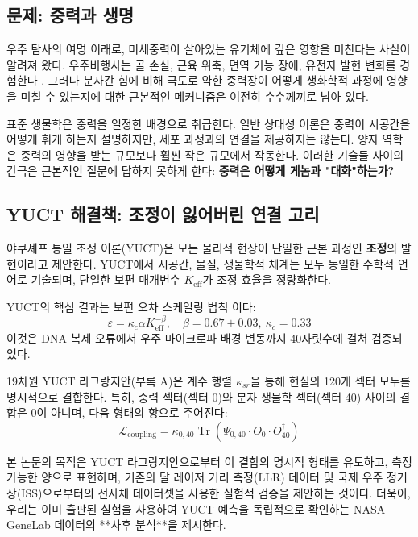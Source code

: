 \documentclass[12pt,a4paper]{article}
\theoremstyle{remark}
\newcommand{\Keff}{K_{\mathrm{eff}}}
\newcommand{\kappac}{\kappa_c}
\newcommand{\eps}{\varepsilon}
\begin{document}
	\subsection{문제: 중력과 생명}
	
	우주 탐사의 여명 이래로, 미세중력이 살아있는 유기체에 깊은 영향을 미친다는 사실이 알려져 왔다. 우주비행사는 골 손실, 근육 위축, 면역 기능 장애, 유전자 발현 변화를 경험한다 \cite{NASA-GeneLab, SpaceX-2023}. 그러나 분자간 힘에 비해 극도로 약한 중력장이 어떻게 생화학적 과정에 영향을 미칠 수 있는지에 대한 근본적인 메커니즘은 여전히 수수께끼로 남아 있다.
	
	표준 생물학은 중력을 일정한 배경으로 취급한다. 일반 상대성 이론은 중력이 시공간을 어떻게 휘게 하는지 설명하지만, 세포 과정과의 연결을 제공하지는 않는다. 양자 역학은 중력의 영향을 받는 규모보다 훨씬 작은 규모에서 작동한다. 이러한 기술들 사이의 간극은 근본적인 질문에 답하지 못하게 한다: \textbf{중력은 어떻게 게놈과 "대화"하는가?}
	
	\subsection{YUCT 해결책: 조정이 잃어버린 연결 고리}
	
	야쿠셰프 통일 조정 이론(YUCT)은 모든 물리적 현상이 단일한 근본 과정인 \textbf{조정}의 발현이라고 제안한다. YUCT에서 시공간, 물질, 생물학적 체계는 모두 동일한 수학적 언어로 기술되며, 단일한 보편 매개변수 \(\Keff\)가 조정 효율을 정량화한다.
	
	YUCT의 핵심 결과는 보편 오차 스케일링 법칙 \cite{AppendixL}이다:
	\begin{equation}
		\eps = \kappac \alpha \Keff^{-\beta}, \quad \beta = 0.67 \pm 0.03,\ \kappac = 0.33
		\label{eq:universal-scaling}
	\end{equation}
	이것은 DNA 복제 오류에서 우주 마이크로파 배경 변동까지 40자릿수에 걸쳐 검증되었다.
	
	19차원 YUCT 라그랑지안(부록 A)은 계수 행렬 \(\kappa_{sr}\)을 통해 현실의 120개 섹터 모두를 명시적으로 결합한다. 특히, 중력 섹터(섹터 0)와 분자 생물학 섹터(섹터 40) 사이의 결합은 0이 아니며, 다음 형태의 항으로 주어진다:
	\begin{equation}
		\mathcal{L}_{\text{coupling}} = \kappa_{0,40} \operatorname{Tr}(\Psi_{0,40} \cdot O_0 \cdot O_{40}^\dagger)
		\label{eq:coupling-general}
	\end{equation}
	
	본 논문의 목적은 YUCT 라그랑지안으로부터 이 결합의 명시적 형태를 유도하고, 측정 가능한 양으로 표현하며, 기존의 달 레이저 거리 측정(LLR) 데이터 및 국제 우주 정거장(ISS)으로부터의 전사체 데이터셋을 사용한 실험적 검증을 제안하는 것이다. 더욱이, 우리는 이미 출판된 실험을 사용하여 YUCT 예측을 독립적으로 확인하는 NASA GeneLab 데이터의 **사후 분석**을 제시한다.
	
\end{document}

